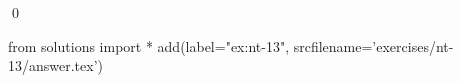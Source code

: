 
\begin{ex} 
  \label{ex:nt-13}
  
  \qed
\end{ex} 
\begin{python0}
from solutions import *
add(label="ex:nt-13",
    srcfilename='exercises/nt-13/answer.tex') 
\end{python0}
